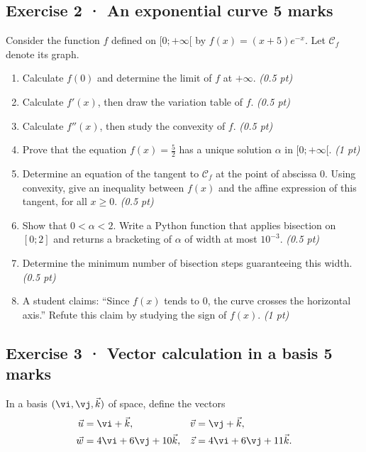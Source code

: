 \subsection*{Exercise 2 · An exponential curve \hfill 5 marks}Consider the function $f$ defined on $[0;+\infty[$ by $f(x)=(x+5)e^{-x}$. Let $\mathcal C_f$ denote its graph.

\begin{enumerate}

\item Calculate $f(0)$ and determine the limit of $f$ at $+\infty$. \hfill\textit{(0.5 pt)}

\item Calculate $f'(x)$, then draw the variation table of $f$. \hfill\textit{(0.5 pt)}

\item Calculate $f''(x)$, then study the convexity of $f$. \hfill\textit{(0.5 pt)}

\item Prove that the equation $f(x)=\frac{5}{2}$ has a unique solution $\alpha$ in $[0;+\infty[$. \hfill\textit{(1 pt)}

\item Determine an equation of the tangent to $\mathcal C_f$ at the point of abscissa $0$. Using convexity, give an inequality between $f(x)$ and the affine expression of this tangent, for all $x\ge0$. \hfill\textit{(0.5 pt)}

\item Show that $0<\alpha<2$. Write a Python function that applies bisection on $[0;2]$ and returns a bracketing of $\alpha$ of width at most $10^{-3}$. \hfill\textit{(0.5 pt)}

\item Determine the minimum number of bisection steps guaranteeing this width. \hfill\textit{(0.5 pt)}

\clearpage\item A student claims: ``Since $f(x)$ tends to $0$, the curve crosses the horizontal axis.'' Refute this claim by studying the sign of $f(x)$. \hfill\textit{(1 pt)}

\end{enumerate}

\clearpage{}\par

\subsection*{Exercise 3 · Vector calculation in a basis \hfill 5 marks}In a basis $(\vi,\vj,\vec k)$ of space, define the vectors
\[\begin{aligned}\vec u&=\vi+\vec k,&\vec v&=\vj+\vec k,\\
\vec w&=4\vi+6\vj+10\vec k,&\vec z&=4\vi+6\vj+11\vec k.\end{aligned}\]

